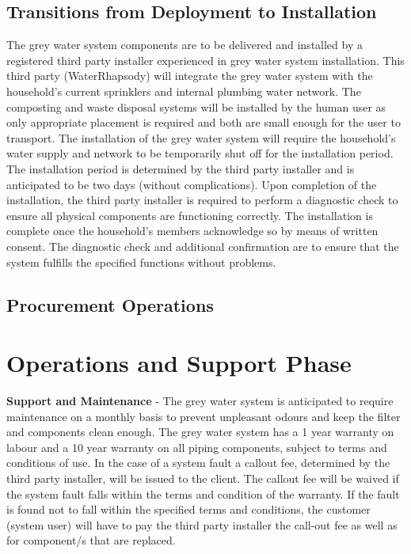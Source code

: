 \documentclass[a4paper,11pt,fleqn]{report}
\begin{document}
\subsection{Transitions from Deployment to Installation}
The grey water system components are to be delivered and installed by a registered third party installer experienced in grey water system installation. This third party (WaterRhapsody) will integrate the grey water system with the household's current sprinklers and internal plumbing water network. The composting and waste disposal systems will be installed by the human user as only appropriate placement is required and both are small enough for the user to transport. The installation of the grey water system will require the household's water supply and network to be temporarily shut off for the installation period. The installation period is determined by the third party installer and is anticipated to be two days (without complications).  Upon completion of the installation, the third party installer is required to perform a diagnostic check to ensure all physical components are functioning correctly. The installation is complete once the household's members acknowledge so by means of written consent. The diagnostic check and additional confirmation are to ensure that the system fulfills the specified functions without problems.

\subsection{Procurement Operations}

\section{Operations and Support Phase}
\textbf{Support and Maintenance} - The grey water system is anticipated to require maintenance on a monthly basis to prevent unpleasant odours and keep the filter and components clean enough. The grey water system has a 1 year warranty on labour and a 10 year warranty on all piping components, subject to terms and conditions of use. In the case of a system fault a callout fee, determined by the third party installer,  will be issued to the client. The callout fee will be waived if the system fault falls within the terms and condition of the warranty. If the fault is found not to fall within the specified terms and conditions, the customer (system user) will have to pay the third party installer the call-out fee as well as for component/s that are replaced.
\end{document}
